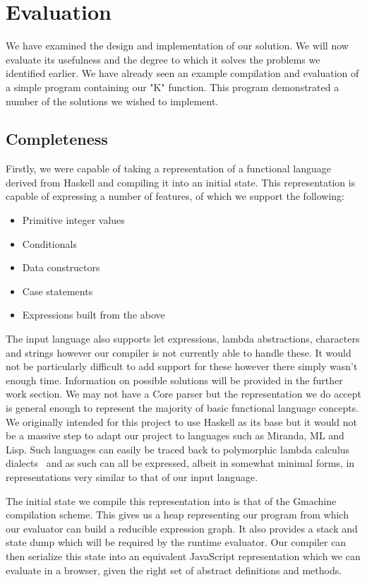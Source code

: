 \section{Evaluation}
We have examined the design and implementation of our solution.
We will now evaluate its usefulness and the degree to which it
solves the problems we identified earlier. We have already seen
an example compilation and evaluation of a simple program containing
our "K" function. This program demonstrated a number of the solutions
we wished to implement.

\subsection{Completeness}
Firstly, we were capable of taking a representation of a functional
language derived from Haskell and compiling it into an initial state.
This representation is capable of expressing
a number of features, of which we support the following:

\begin{itemize}
	\item Primitive integer values
	\item Conditionals
	\item Data constructors
	\item Case statements
	\item Expressions built from the above
\end{itemize}

\noindent The input language also supports let expressions, lambda
abstractions, characters and strings however our compiler is not
currently able to handle these. It would not be particularly 
difficult to add support for these however there simply wasn't
enough time. Information on possible solutions will be provided
in the further work section. We may not have a Core parser but
the representation we do accept is general enough to represent
the majority of basic functional language concepts. We originally
intended for this project to use Haskell as its base but it would
not be a massive step to adapt our project to languages such as
Miranda, ML and Lisp. Such languages can easily be traced back to
polymorphic lambda calculus dialects~\cite[pp.10]{SystemF} and as such 
can all be expressed, albeit in somewhat minimal forms, in 
representations very similar to that of our input language.

The initial state we compile this representation into is that of
the Gmachine compilation scheme. This gives us a heap representing
our program from which our evaluator can build a reducible expression
graph. It also provides a stack and state dump which will be 
required by the runtime evaluator. Our compiler can then serialize
this state into an equivalent JavaScript representation which we can
evaluate in a browser, given the right set of abstract definitions
and methods.

